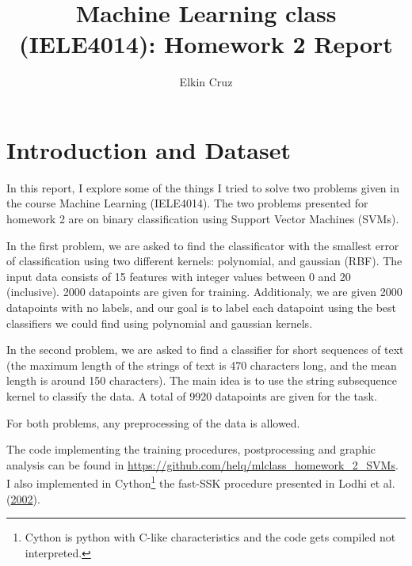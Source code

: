 \documentclass[format=acmtog]{acmart}
\title{Machine Learning class (IELE4014): Homework 2 Report}
\begin{document}
\author{Elkin Cruz}



\renewcommand\footnotetextcopyrightpermission[1]{}


\newcommand{\nocaptionrule}[0]{}

\maketitle

\renewcommand{\shortauthors}{Elkin Cruz}


\section{Introduction and Dataset}\label{introduction-and-dataset}

In this report, I explore some of the things I tried to solve two
problems given in the course Machine Learning (IELE4014). The two
problems presented for homework 2 are on binary classification using
Support Vector Machines (SVMs).

In the first problem, we are asked to find the classificator with the
smallest error of classification using two different kernels:
polynomial, and gaussian (RBF). The input data consists of 15 features
with integer values between 0 and 20 (inclusive). 2000 datapoints are
given for training. Additionaly, we are given 2000 datapoints with no
labels, and our goal is to label each datapoint using the best
classifiers we could find using polynomial and gaussian kernels.

In the second problem, we are asked to find a classifier for short
sequences of text (the maximum length of the strings of text is 470
characters long, and the mean length is around 150 characters). The main
idea is to use the string subsequence kernel to classify the data. A
total of 9920 datapoints are given for the task.

For both problems, any preprocessing of the data is allowed.

The code implementing the training procedures, postprocessing and
graphic analysis can be found in
\url{https://github.com/helq/mlclass_homework_2_SVMs}. I also
implemented in Cython\footnote{Cython is python with C-like
  characteristics and the code gets compiled not interpreted.} the
fast-SSK procedure presented in Lodhi et al.
(\protect\hyperlink{ref-lodhi2002text}{2002}).
\end{document}
